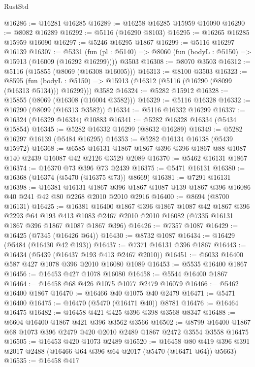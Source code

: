 \begin{lexlean}{RustStd}
\begin{coremodule}
{\begin{coremodule}
{{{{{{{{{{{{{{{{{{{{{{{{{{{{{{{@16286 := @16281 @16285
@16289 := @16258 @16285 @15959 @16090
@16290 := @8082 @16289
@16292 := @5116 (@16290 @8103)
@16295 := @16265 @16285 @15959 @16090
@16297 := @5246 @16295 @1867
@16299 := @5116 @16297 @16139
@16307 := @5331
    (fun (pl : @5140) => @8060 (fun (bodyL : @5150) => @15913 (@16009 (@16292 @16299))))
    @3503
@16308 := @8070 @3503
@16312 := @5116 (@15855 (@8069 (@16308 @16005)))
@16313 := @8100 @3503
@16323 := @8595
    (fun (bodyL : @5150) => @15913 (@16312 (@5116 (@16290 (@8099 (@16313 @5134))) @16299)))
    @3582
@16324 := @5282 @15912
@16328 := @15855 (@8069 (@16308 (@16004 @3582)))
@16329 := @5116 @16328
@16332 := @16290 (@8099 (@16313 @3582))
@16334 := @5116 @16332 @16299
@16337 := @16324 (@16329 @16334) @10883
@16341 := @5282 @16328 @16334 (@5434 @15854)
@16345 := @5282 @16332 @16299 (@8632 @16289)
@16349 := @5282 @16297 @16139 (@5484 @16295)
@16353 := @5282 @16134 @16138 (@5439 @15972)
@16368 := @6585 @16131 @1867 @1867 @396 @396 @1867 @88 @1087 @140 @2439 @16087 @42 @2126 @3529 @2089
@16370 := @5462 @16131 @1867
@16374 := @16370 @73 @396 @73 @2439
@16375 := @5471 @16131
@16380 := @16368 (@16374 (@5470 (@16375 @73)) @8669)
@16381 := @7291 @16131
@16398 := @16381
    @16131
    @1867
    @396
    @1867
    @1087
    @139
    @1867
    @396
    @16086
    @40
    @241
    @42
    @80
    @2268
    @2010
    @2010
    @2916
@16400 := @8694 (@8700 @16131)
@16425 := @16381
    @16400
    @1867
    @396
    @1867
    @1087
    @42
    @1867
    @396
    @2293
    @64
    @193
    @413
    @1083
    @2467
    @2010
    @2010
    @16082
    (@7335 @16131 @1867 @396 @1867 @1087 @1867 @396)
@16426 := @7357 @1087
@16429 := @16425 (@7345 (@16426 @64))
@16430 := @8732 @1087
@16434 := @16429 (@5484 (@16430 @42 @193))
@16437 := @7371 @16131 @396 @1867
@16443 := @16434 (@5439 (@16437 @193 @413 @2467 @2010))
@16451 := @6033 @16400 @587 @427 @1078 @396 @2010 @16080 @1089
@16453 := @5535 @16400 @1867
@16456 := @16453 @427 @1078 @16080
@16458 := @5544 @16400 @1867
@16464 := @16458 @68 @426 @1075 @1077 @2479 @16079
@16466 := @5462 @16400 @1867
@16470 := @16466 @40 @1075 @40 @2479
@16471 := @5471 @16400
@16475 := @16470 (@5470 (@16471 @40)) @8781
@16476 := @16464 @16475
@16482 := @16458 @421 @425 @396 @398 @3568 @8347
@16488 := @6604 @16400 @1867 @421 @396 @3562 @3566
@16502 := @8799 @16400 @1867 @68 @1073 @396 @2479 @420 @2010 @2489 @1867 @2472 @3554 @3558 @16475
@16505 := @16453 @420 @1073 @2489
@16520 := @16458
    @80
    @419
    @396
    @391
    @2017
    @2488
    (@16466 @64 @396 @64 @2017 (@5470 (@16471 @64)) @5663)
@16535 := @16458
    @417
}}}}}}}}}}}}}}}}}}}}}}}}}}}}}}}
\end{coremodule}}
\end{coremodule}
\end{lexlean}
